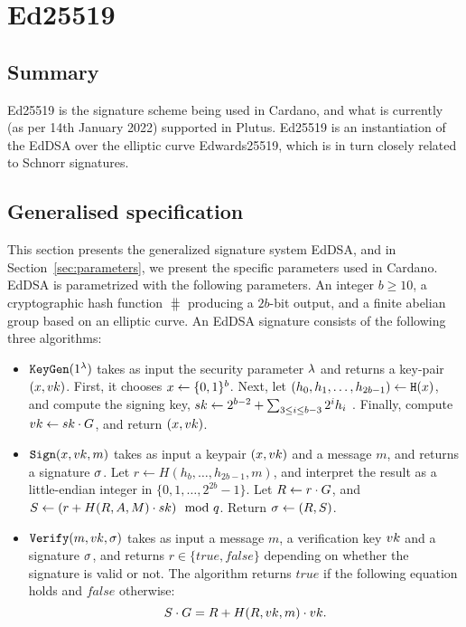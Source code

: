 \section{Ed25519}
\label{sec:ed25519}

\subsection{Summary}
Ed25519 is the signature scheme being used in Cardano, and what is currently (as per 14th January 2022) supported in
Plutus. Ed25519 is an instantiation of the EdDSA over the elliptic curve Edwards25519, which is in turn closely
related to Schnorr signatures.

\subsection{Generalised specification}
This section presents the generalized signature system EdDSA, and in Section~\ref{sec:parameters}, we present the
specific parameters used in Cardano. EdDSA is parametrized with the following parameters. An integer $b\geq 10$, a
cryptographic hash function $\hash$ producing a $2b$-bit output, and a finite abelian group based on an elliptic
curve. An EdDSA signature consists of the following three algorithms:
\begin{itemize}
    \item $\texttt{KeyGen}(1^\lambda)$ takes as input the security parameter $\lambda$ and returns a key-pair $
    (x, vk)$. First, it chooses $x\leftarrow\{0,1\}^b$. Next, let $(h_0, h_1, \ldots, h_{2b - 1})
    \gets\texttt{H}(x)$, and compute the signing key, $sk \gets 2^{b-2} + \sum_{3\leq i\leq b-3}2^i h_i$
    . Finally, compute $vk \gets sk \cdot G$, and return $(x, vk)$.
    \item $\texttt{Sign}(x, vk, m)$ takes as input a keypair $(x, vk)$ and a message $m$, and returns a
    signature $\sigma$. Let $r \gets H(h_b, \ldots, h_{2b-1}, m)$, and interpret the result as a little-endian
    integer in $\{0,1,\ldots, 2^{2b}-1\}$. Let $R \gets r\cdot G$, and $S \gets (r + H(R, A, M)\cdot
    sk) \mod {q}$. Return $\sigma \gets (R, S)$.
    \item $\texttt{Verify}(m, vk, \sigma)$ takes as input a message $m$, a verification key $vk$ and a signature
    $\sigma$, and returns $r\in\{true, false\}$ depending on whether the signature is valid or not. The algorithm
    returns $true$ if the following equation holds and $false$ otherwise:
    \[S\cdot G = R + H(R, vk, m)\cdot vk.\]
\end{itemize}

